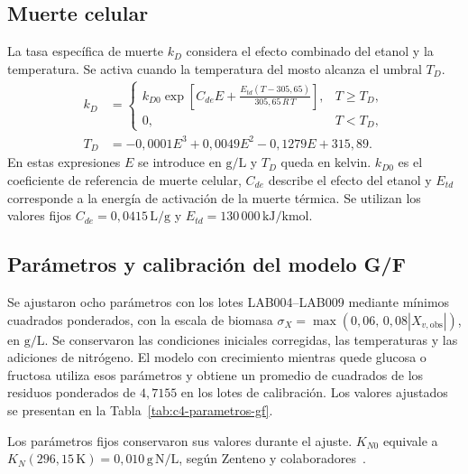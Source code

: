 \subsection{Muerte celular}

La tasa espec\'ifica de muerte \(k_D\) considera el efecto
combinado del etanol y la temperatura. Se activa cuando la
temperatura del mosto alcanza el umbral \(T_D\).
\begin{align}
  k_D &=
    \begin{cases}
      \displaystyle k_{D0}\exp\!\left[C_{de}E+
        \frac{E_{td}(T-305{,}65)}{305{,}65\,R\,T}\right],
        & T\ge T_D,\\[6pt]
      0, & T<T_D,
    \end{cases}
    \label{eq:c4-muerte}\\[4pt]
  T_D &= -0{,}0001E^3+0{,}0049E^2-0{,}1279E+315{,}89 .
    \label{eq:c4-temperatura-muerte}
\end{align}
En estas expresiones \(E\) se introduce en \(\mathrm{g/L}\)
y \(T_D\) queda en kelvin. \(k_{D0}\) es el coeficiente de
referencia de muerte celular, \(C_{de}\) describe el efecto del
etanol y \(E_{td}\) corresponde a la energ\'ia de activaci\'on
de la muerte t\'ermica. Se utilizan los valores fijos
\(C_{de}=0{,}0415\,\mathrm{L/g}\) y
\(E_{td}=130\,000\,\mathrm{kJ/kmol}\).

\clearpage
\subsection{Par\'ametros y calibraci\'on del modelo G/F}

Se ajustaron ocho par\'ametros con los lotes LAB004--LAB009
mediante m\'inimos cuadrados ponderados, con la escala de biomasa
\(\sigma_X=\max(0{,}06,\,0{,}08|X_{v,\mathrm{obs}}|)\),
en \(\mathrm{g/L}\). Se conservaron las condiciones iniciales
corregidas, las temperaturas y las adiciones de nitr\'ogeno.
El modelo con crecimiento mientras quede glucosa o fructosa
utiliza esos par\'ametros y obtiene un promedio de cuadrados
de los residuos ponderados de \(4{,}7155\) en los lotes de
calibraci\'on. Los valores ajustados se presentan en la
Tabla~\ref{tab:c4-parametros-gf}.


Los par\'ametros fijos conservaron sus valores durante el ajuste.
\(K_{N0}\) equivale a \(K_N(296{,}15\,\mathrm{K})=
0{,}010\,\mathrm{g\,N/L}\), seg\'un Zenteno y
colaboradores~\cite{zenteno2010}.

